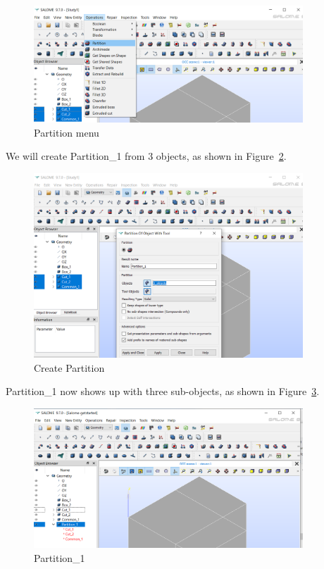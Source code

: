 \begin{figure}[H]
\centering
\includegraphics[width=0.9\textwidth]{Salome-11}
\caption{Partition menu}\label{fg:salome-11}
\end{figure}

We will create Partition\_1 from 3 objects, as shown in Figure~\ref{fg:salome-12}.

\begin{figure}[H]
\centering
\includegraphics[width=0.9\textwidth]{Salome-12}
\caption{Create Partition}\label{fg:salome-12}
\end{figure}

Partition\_1 now shows up with three sub-objects, as shown in Figure~\ref{fg:salome-13}.  

\begin{figure}[H]
\centering
\includegraphics[width=0.9\textwidth]{Salome-13}
\caption{Partition\_1}\label{fg:salome-13}
\end{figure}

